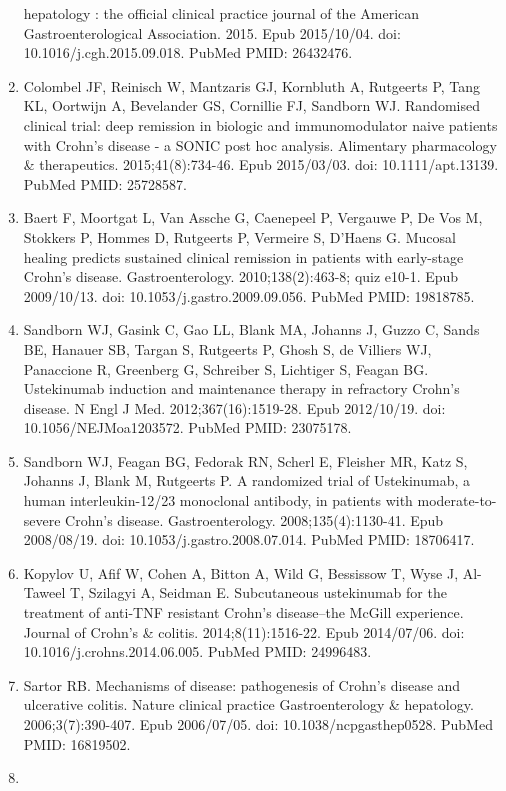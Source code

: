 \documentclass[11pt,]{article}
\begin{document}
\begin{enumerate}
  hepatology : the official clinical practice journal of the American
  Gastroenterological Association. 2015. Epub 2015/10/04. doi:
  10.1016/j.cgh.2015.09.018. PubMed PMID: 26432476.
\item
  Colombel JF, Reinisch W, Mantzaris GJ, Kornbluth A, Rutgeerts P, Tang
  KL, Oortwijn A, Bevelander GS, Cornillie FJ, Sandborn WJ. Randomised
  clinical trial: deep remission in biologic and immunomodulator naive
  patients with Crohn's disease - a SONIC post hoc analysis. Alimentary
  pharmacology \& therapeutics. 2015;41(8):734-46. Epub 2015/03/03. doi:
  10.1111/apt.13139. PubMed PMID: 25728587.
\item
  Baert F, Moortgat L, Van Assche G, Caenepeel P, Vergauwe P, De Vos M,
  Stokkers P, Hommes D, Rutgeerts P, Vermeire S, D'Haens G. Mucosal
  healing predicts sustained clinical remission in patients with
  early-stage Crohn's disease. Gastroenterology. 2010;138(2):463-8; quiz
  e10-1. Epub 2009/10/13. doi: 10.1053/j.gastro.2009.09.056. PubMed
  PMID: 19818785.
\item
  Sandborn WJ, Gasink C, Gao LL, Blank MA, Johanns J, Guzzo C, Sands BE,
  Hanauer SB, Targan S, Rutgeerts P, Ghosh S, de Villiers WJ, Panaccione
  R, Greenberg G, Schreiber S, Lichtiger S, Feagan BG. Ustekinumab
  induction and maintenance therapy in refractory Crohn's disease. N
  Engl J Med. 2012;367(16):1519-28. Epub 2012/10/19. doi:
  10.1056/NEJMoa1203572. PubMed PMID: 23075178.
\item
  Sandborn WJ, Feagan BG, Fedorak RN, Scherl E, Fleisher MR, Katz S,
  Johanns J, Blank M, Rutgeerts P. A randomized trial of Ustekinumab, a
  human interleukin-12/23 monoclonal antibody, in patients with
  moderate-to-severe Crohn's disease. Gastroenterology.
  2008;135(4):1130-41. Epub 2008/08/19. doi:
  10.1053/j.gastro.2008.07.014. PubMed PMID: 18706417.
\item
  Kopylov U, Afif W, Cohen A, Bitton A, Wild G, Bessissow T, Wyse J,
  Al-Taweel T, Szilagyi A, Seidman E. Subcutaneous ustekinumab for the
  treatment of anti-TNF resistant Crohn's disease--the McGill
  experience. Journal of Crohn's \& colitis. 2014;8(11):1516-22. Epub
  2014/07/06. doi: 10.1016/j.crohns.2014.06.005. PubMed PMID: 24996483.
\item
  Sartor RB. Mechanisms of disease: pathogenesis of Crohn's disease and
  ulcerative colitis. Nature clinical practice Gastroenterology \&
  hepatology. 2006;3(7):390-407. Epub 2006/07/05. doi:
  10.1038/ncpgasthep0528. PubMed PMID: 16819502.
\item

\end{enumerate}
\end{document}
